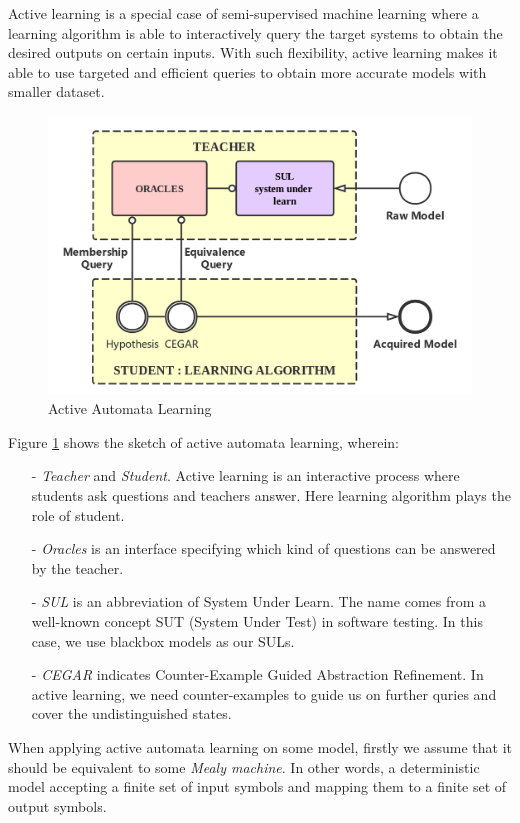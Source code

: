 \documentclass[conference, a4paper]{IEEEtran}
\begin{document}
Active learning \cite{settles2010active} is a special case of semi-supervised machine learning where
a learning algorithm is able to interactively query the target systems to obtain the desired outputs
on certain inputs. With such flexibility, active learning makes it able to use targeted and efficient
queries to obtain more accurate models with smaller dataset. 


\begin{figure}[h]
  \begin{center}
    \includegraphics[width=.5\textwidth]{./images/activelearning.png}
  \end{center}
  \caption{Active Automata Learning}
  \label{fig:activelearning}
\end{figure}

Figure \ref{fig:activelearning} shows the sketch of active automata learning, wherein:
\begin{itemize}
  \item[-] \emph{Teacher} and \emph{Student}. Active learning is an interactive process where
    students ask questions and teachers answer. Here learning algorithm plays the role of student.
  \item[-] \emph{Oracles} is an interface specifying which kind of questions can be answered by the
    teacher.
  \item[-] \emph{SUL} is an abbreviation of System Under Learn. The name comes from a well-known
    concept SUT (System Under Test) in software testing. In this case, we use blackbox models as our
    SULs.
  \item[-] \emph{CEGAR} indicates Counter-Example Guided Abstraction
    Refinement\cite{DBLP:conf/cav/ClarkeGJLV00}. In active learning, we need counter-examples to
    guide us on further quries and cover the undistinguished states.
\end{itemize}

When applying active automata learning on some model, firstly we assume that it should be equivalent
to some \emph{Mealy machine}. In other words, a deterministic model accepting a finite set of input
symbols and mapping them to a finite set of output symbols.
\end{document}
